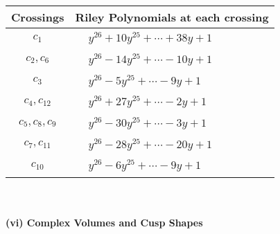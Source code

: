 \documentclass[1p]{elsarticle_modified}
\theoremstyle{definition}
\begin{document}
\begin{tabular}{m{50pt}|m{274pt}}
Crossings & \hspace{64pt}Riley Polynomials at each crossing \\
\hline $$\begin{aligned}c_{1}\end{aligned}$$&$\begin{aligned}
&y^{26}+10 y^{25}+\cdots+38 y+1
\end{aligned}$\\
\hline $$\begin{aligned}c_{2},c_{6}\end{aligned}$$&$\begin{aligned}
&y^{26}-14 y^{25}+\cdots-10 y+1
\end{aligned}$\\
\hline $$\begin{aligned}c_{3}\end{aligned}$$&$\begin{aligned}
&y^{26}-5 y^{25}+\cdots-9 y+1
\end{aligned}$\\
\hline $$\begin{aligned}c_{4},c_{12}\end{aligned}$$&$\begin{aligned}
&y^{26}+27 y^{25}+\cdots-2 y+1
\end{aligned}$\\
\hline $$\begin{aligned}c_{5},c_{8},c_{9}\end{aligned}$$&$\begin{aligned}
&y^{26}-30 y^{25}+\cdots-3 y+1
\end{aligned}$\\
\hline $$\begin{aligned}c_{7},c_{11}\end{aligned}$$&$\begin{aligned}
&y^{26}-28 y^{25}+\cdots-20 y+1
\end{aligned}$\\
\hline $$\begin{aligned}c_{10}\end{aligned}$$&$\begin{aligned}
&y^{26}-6 y^{25}+\cdots-9 y+1
\end{aligned}$\\
\hline
\end{tabular}\\~\\
\newpage\flushleft \textbf{(vi) Complex Volumes and Cusp Shapes}
\end{document}
